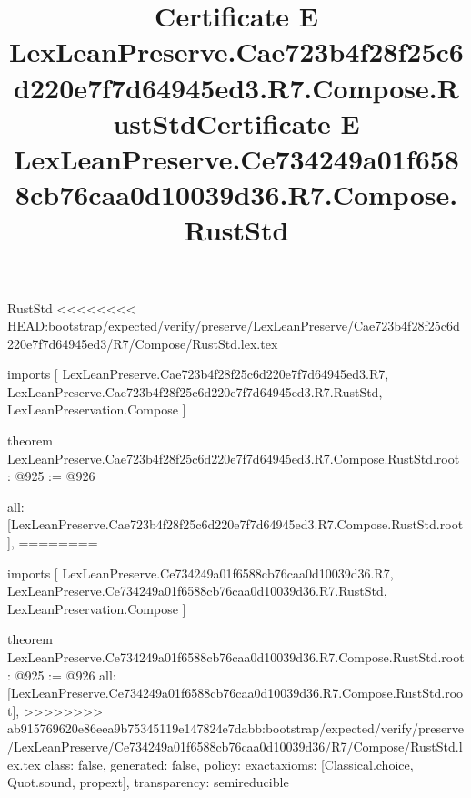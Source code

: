 \begin{lexlean}{RustStd}
<<<<<<<< HEAD:bootstrap/expected/verify/preserve/LexLeanPreserve/Cae723b4f28f25c6d220e7f7d64945ed3/R7/Compose/RustStd.lex.tex
\title{Certificate E LexLeanPreserve.Cae723b4f28f25c6d220e7f7d64945ed3.R7.Compose.RustStd}
\begin{coremodule}
imports [
  LexLeanPreserve.Cae723b4f28f25c6d220e7f7d64945ed3.R7,
  LexLeanPreserve.Cae723b4f28f25c6d220e7f7d64945ed3.R7.RustStd,
  LexLeanPreservation.Compose
]

theorem LexLeanPreserve.Cae723b4f28f25c6d220e7f7d64945ed3.R7.Compose.RustStd.root : @925 := @926 {
  all: [LexLeanPreserve.Cae723b4f28f25c6d220e7f7d64945ed3.R7.Compose.RustStd.root],
========
\title{Certificate E LexLeanPreserve.Ce734249a01f6588cb76caa0d10039d36.R7.Compose.RustStd}
\begin{coremodule}
imports [
  LexLeanPreserve.Ce734249a01f6588cb76caa0d10039d36.R7,
  LexLeanPreserve.Ce734249a01f6588cb76caa0d10039d36.R7.RustStd,
  LexLeanPreservation.Compose
]

theorem LexLeanPreserve.Ce734249a01f6588cb76caa0d10039d36.R7.Compose.RustStd.root : @925 := @926 {
  all: [LexLeanPreserve.Ce734249a01f6588cb76caa0d10039d36.R7.Compose.RustStd.root],
>>>>>>>> ab915769620e86eea9b75345119e147824e7dabb:bootstrap/expected/verify/preserve/LexLeanPreserve/Ce734249a01f6588cb76caa0d10039d36/R7/Compose/RustStd.lex.tex
  class: false,
  generated: false,
  policy: exact{axioms: [Classical.choice, Quot.sound, propext]},
  transparency: semireducible
}


\end{coremodule}}
\end{coremodule}
\end{lexlean}
